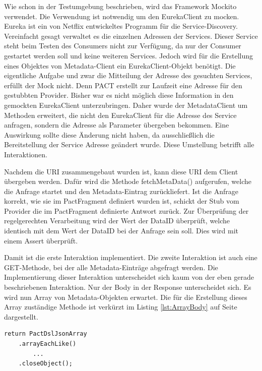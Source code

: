 \documentclass{llncs}
\begin{document}
Wie schon in der Testumgebung beschrieben, wird das Framework Mockito verwendet. Die Verwendung ist notwendig um den EurekaClient zu mocken. Eureka \cite{Ranganathan2012} ist ein von Netflix entwickeltes Programm für die Service-Discovery. Vereinfacht gesagt verwaltet es die einzelnen Adressen der Services. Dieser Service steht beim Testen des Consumers nicht zur Verfügung, da nur der Consumer gestartet werden soll und keine weiteren Services. Jedoch wird für die Erstellung eines Objektes von Metadata-Client ein EurekaClient-Objekt benötigt. Die eigentliche Aufgabe und zwar die Mitteilung der Adresse des gesuchten Services, erfüllt der Mock nicht. Denn PACT erstellt zur Laufzeit eine Adresse für den gestubbten Provider. Bisher war es nicht möglich diese Information in den gemockten EurekaClient unterzubringen. Daher wurde der MetadataClient um Methoden erweitert, die nicht den EurekaClient für die Adresse des Service anfragen, sondern die Adresse als Parameter übergeben bekommen. Eine Auswirkung sollte diese Änderung nicht haben, da ausschließlich die Bereitstellung der Service Adresse geändert wurde. Diese Umstellung betrifft alle Interaktionen.

Nachdem die URI zusammengebaut wurden ist, kann diese URI dem Client übergeben werden. Dafür wird die Methode fetchMetaData() aufgerufen, welche die Anfrage startet und den Metadata-Eintrag zurückliefert. Ist die Anfrage korrekt, wie sie im PactFragment definiert wurden ist, schickt der Stub vom Provider die im PactFragment definierte Antwort zurück. Zur Überprüfung der regelgerechten Verarbeitung wird der Wert der DataID überprüft, welche identisch mit dem Wert der DataID bei der Anfrage sein soll. Dies wird mit einem Assert überprüft.

Damit ist die erste Interaktion implementiert. Die zweite Interaktion ist auch eine GET-Methode, bei der alle Metadata-Einträge abgefragt werden. Die Implementierung dieser Interaktion unterscheidet sich kaum von der eben gerade beschriebenen Interaktion. Nur der Body in der Response unterscheidet sich. Es wird nun Array von Metadata-Objekten erwartet. Die für die Erstellung dieses Array zuständige Methode ist verkürzt im Listing \ref{lst:ArrayBody} auf Seite \pageref{lst:ArrayBody} dargestellt.

\lstset{language = Java}
\begin{lstlisting}[caption=Erstellung eines Array,label={lst:ArrayBody}]
return PactDslJsonArray
    .arrayEachLike()
        ...
    .closeObject();
\end{lstlisting}
\end{document}
